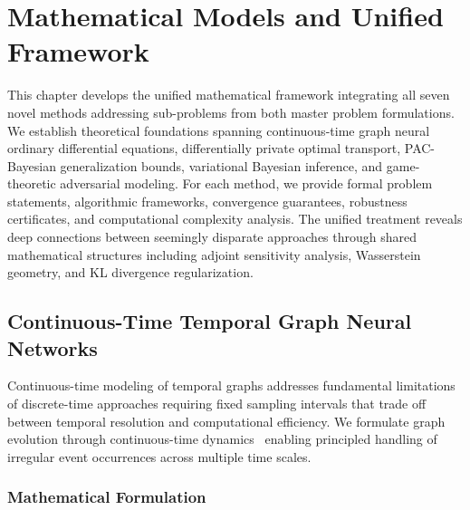 \chapter{Mathematical Models and Unified Framework}
\label{ch:mathematical_models}

This chapter develops the unified mathematical framework integrating all seven novel methods addressing sub-problems from both master problem formulations. We establish theoretical foundations spanning continuous-time graph neural ordinary differential equations, differentially private optimal transport, PAC-Bayesian generalization bounds, variational Bayesian inference, and game-theoretic adversarial modeling. For each method, we provide formal problem statements, algorithmic frameworks, convergence guarantees, robustness certificates, and computational complexity analysis. The unified treatment reveals deep connections between seemingly disparate approaches through shared mathematical structures including adjoint sensitivity analysis, Wasserstein geometry, and KL divergence regularization.

\section{Continuous-Time Temporal Graph Neural Networks}
\label{sec:models_cttgnn}

Continuous-time modeling of temporal graphs addresses fundamental limitations of discrete-time approaches requiring fixed sampling intervals that trade off between temporal resolution and computational efficiency. We formulate graph evolution through continuous-time dynamics~\cite{chen2018neural,salvi2024tabn} enabling principled handling of irregular event occurrences across multiple time scales.




\subsection{Mathematical Formulation}

